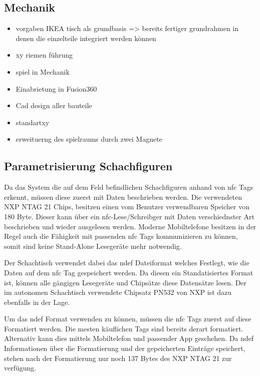 \hypertarget{mechanik}{%
\subsection{Mechanik}\label{mechanik}}

\begin{itemize}
\item
  vorgaben IKEA tisch als grundbasis =\textgreater{} bereits fertiger
  grundrahmen in denen die einzelteile integriert werden können
\item
  xy riemen führung
\item
  spiel in Mechanik
\item
  Einabrietung in Fusion360
\item
  Cad design aller bauteile
\item
  standartxy
\item
  erweituerng des spielraums durch zwei Magnete
\end{itemize}

\hypertarget{parametrisierung-schachfiguren}{%
\subsection{Parametrisierung
Schachfiguren}\label{parametrisierung-schachfiguren}}

Da das System die auf dem Feld befindlichen Schachfiguren anhand von
\gls{nfc} Tags erkennt, müssen diese zuerst mit Daten beschrieben
werden. Die verwendeten NXP NTAG 21 Chips, besitzen einen vom Benutzer
verwendbaren Speicher von 180 Byte. Dieser kann über ein
\gls{nfc}-Lese/Schreibger mit Daten verschiednster Art beschrieben und
wieder ausgelesen werden. Moderne Mobiltelefone besitzen in der Regel
auch die Fähigkeit mit passenden \gls{nfc} Tags kommunizieren zu können,
somit sind keine Stand-Alone Lesegeräte mehr notwendig.

Der Schachtisch verwendet dabei das \gls{ndef} Dateiformat welches
Festlegt, wie die Daten auf dem \gls{nfc} Tag gespeichert werden. Da
diesen ein Standatisiertes Format ist, können alle gängigen Lesegeräte
und Chipsätze diese Datensätze lesen. Der im autonomen Schachtisch
verwendete Chipsatz PN532 von NXP ist dazu ebenfalls in der Lage.

Um das \gls{ndef} Format verwenden zu können, müssen die \gls{nfc} Tags
zuerst auf diese Formatiert werden. Die mesten käuflichen Tags sind
bereits derart formatiert. Alternativ kann dies mittels Mobiltelefon und
passender App geschehen. Da \gls{ndef} Informationen über die
Formatierung und der gepeicherten Einträge speichert, stehen nach der
Formatierung nur noch 137 Bytes des NXP NTAG 21 zur verfügung.

